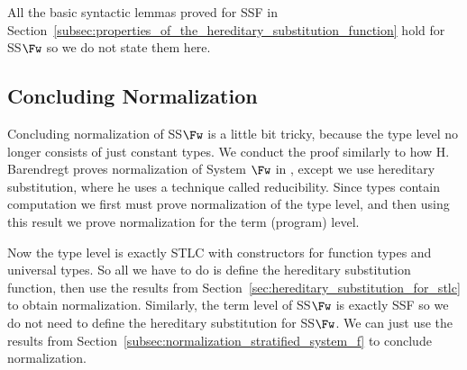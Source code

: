 All the basic syntactic lemmas proved for SSF in
Section~\ref{subsec:properties_of_the_hereditary_substitution_function}
hold for SS$\Fw$ so we do not state them here.

\subsection{Concluding Normalization}
\label{subsec:concluding_normalization_ssfw}
Concluding normalization of SS$\Fw$ is a little bit tricky, because
the type level no longer consists of just constant types.  We conduct
the proof similarly to how H. Barendregt proves normalization of
System $\Fw$ in \cite{barendregt92}, except we use hereditary
substitution, where he uses a technique called reducibility.  Since
types contain computation we first must prove normalization of the
type level, and then using this result we prove normalization for the
term (program) level.  

Now the type level is exactly STLC with constructors for function
types and universal types.  So all we have to do is define the
hereditary substitution function, then use the results from
Section~\ref{sec:hereditary_substitution_for_stlc} to
obtain normalization.  Similarly, the term level of SS$\Fw$ is exactly
SSF so we do not need to define the hereditary substitution for
SS$\Fw$.  We can just use the results from
Section~\ref{subsec:normalization_stratified_system_f} to conclude
normalization.  

